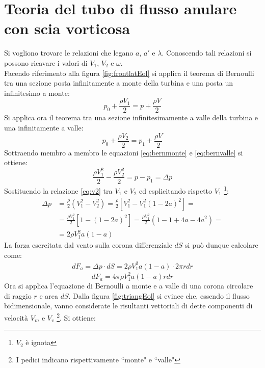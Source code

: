 \section{Teoria del tubo di flusso anulare con scia vorticosa}
Si vogliono trovare le relazioni che legano $a$, $a'$ e $\lambda$. Conoscendo tali relazioni si possono ricavare i valori di $V_1$, $V_2$ e $\omega$.\\
Facendo riferimento alla figura \ref{fig:frontlatEol} si applica il teorema di Bernoulli tra una sezione posta infinitamente a monte della turbina e una posta un infinitesimo a monte:
\begin{equation}\label{eq:bernmonte}
p_0 + \frac{\rho V_1}{2} = p + \frac{\rho V}{2}
\end{equation}
Si applica ora il teorema tra una sezione infinitesimamente a valle della turbina e una infinitamente a valle:
\begin{equation}\label{eq:bernvalle}
p_0 + \frac{\rho V_2}{2} = p_1 + \frac{\rho V}{2}
\end{equation}
Sottraendo membro a membro le equazioni \ref{eq:bernmonte} e \ref{eq:bernvalle} si ottiene:
\begin{equation}
\frac{\rho V_1^2}{2} - \frac{\rho V_2^2}{2} = p - p_1 = \Delta p
\end{equation}
Sostituendo la relazione \ref{eq:v2} tra $V_1$ e $V_2$ ed esplicitando rispetto $V_1$ \footnote{$V_2$ è ignota}:
\begin{align*}
\Delta p &= \frac{\rho}{2} \left(V_1^2 - V_2^2 \right) = \frac{\rho}{2} \left[ V_1^2 - V_1^2 \left(1-2a \right)^2 \right]=\\
&= \frac{\rho V_1^2}{2} \left[ 1- \left( 1- 2a \right)^2 \right] = \frac{\rho V_1^2}{2} \left( 1- 1+4a-4a^2 \right)=\\
&= 2 \rho V_1^2 a \left( 1-a \right)
\end{align*}
La forza esercitata dal vento sulla corona differenziale $dS$ si può dunque calcolare come:
\begin{align*}
dF_a = \Delta p \cdot dS = 2 \rho V_1^2 a \left( 1-a \right) \cdot 2 \pi r dr
\end{align*}
\begin{equation}\label{eq:forza1}
dF_a = 4 \pi \rho	V_1^2 a \left( 1-a \right) r dr
\end{equation}
Ora si applica l'equazione di Bernoulli a monte e a valle di una corona circolare di raggio $r$ e area $dS$. Dalla figura \ref{fig:triangEol} si evince che, essendo il flusso bidimensionale, vanno considerate le risultanti vettoriali di dette componenti di velocità $V_m$ e $V_v$ \footnote{I pedici indicano rispettivamente ``monte" e ``valle"}. Si ottiene:

